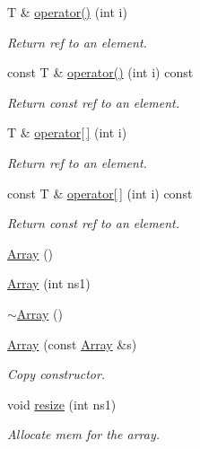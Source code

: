 \begin{DoxyCompactItemize}
T \& \mbox{\hyperlink{classXMLArray_1_1Array_aaa5b7fcaa413265173fc75d3a5bbf837}{operator()}} (int i)
\begin{DoxyCompactList}\small\item\em Return ref to an element. \end{DoxyCompactList}\item 
const T \& \mbox{\hyperlink{classXMLArray_1_1Array_a6935c8d1efcf82e7c751717a94e7c145}{operator()}} (int i) const
\begin{DoxyCompactList}\small\item\em Return const ref to an element. \end{DoxyCompactList}\item 
T \& \mbox{\hyperlink{classXMLArray_1_1Array_a42dbfab67d875b6fa456cade78f70f8f}{operator\mbox{[}$\,$\mbox{]}}} (int i)
\begin{DoxyCompactList}\small\item\em Return ref to an element. \end{DoxyCompactList}\item 
const T \& \mbox{\hyperlink{classXMLArray_1_1Array_a8e51d308c4e6b81cdbf1be40377afda8}{operator\mbox{[}$\,$\mbox{]}}} (int i) const
\begin{DoxyCompactList}\small\item\em Return const ref to an element. \end{DoxyCompactList}\item 
\mbox{\hyperlink{classXMLArray_1_1Array_a5b81635bef141ec21cbb11a4ae235aff}{Array}} ()
\item 
\mbox{\hyperlink{classXMLArray_1_1Array_ae2ff376197c96aa965c9b04297b013cd}{Array}} (int ns1)
\item 
\mbox{\hyperlink{classXMLArray_1_1Array_ae344c6bdb93a8e4e2b5b42fda7abf94d}{$\sim$\+Array}} ()
\item 
\mbox{\hyperlink{classXMLArray_1_1Array_ab755ad52a24c32ad23940b23b1d03968}{Array}} (const \mbox{\hyperlink{classXMLArray_1_1Array}{Array}} \&s)
\begin{DoxyCompactList}\small\item\em Copy constructor. \end{DoxyCompactList}\item 
void \mbox{\hyperlink{classXMLArray_1_1Array_a470913fde270ad0e578041654e2390f0}{resize}} (int ns1)
\begin{DoxyCompactList}\small\item\em Allocate mem for the array. \end{DoxyCompactList}\item 

\end{DoxyCompactItemize}
